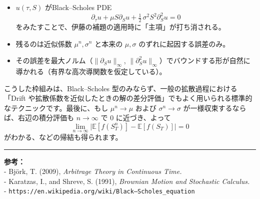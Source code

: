 \documentclass[a4paper]{jsarticle}
\begin{document}
\begin{itemize}  
\item $u(\tau,S)$ がBlack--Scholes PDE  
\[  
  \partial_\tau u + \mu S \partial_S u + \tfrac12\,\sigma^2 S^2 \partial_S^2 u = 0  
\]  
をみたすことで、伊藤の補題の適用時に「主項」が打ち消される。  
\item 残るのは近似係数 $\mu^n,\sigma^n$ と本来の $\mu,\sigma$ のずれに起因する誤差のみ。  
\item その誤差を最大ノルム（$\|\partial_S u\|_\infty$, $\|\partial_S^2 u\|_\infty$）でバウンドする形が自然に導かれる（有界な高次導関数を仮定している）。  
\end{itemize}  

こうした枠組みは、Black--Scholes 型のみならず、一般の拡散過程における「Drift や拡散係数を近似したときの解の差分評価」でもよく用いられる標準的なテクニックです。最後に、もし $\mu^n \to \mu$ および $\sigma^n \to \sigma$ が一様収束するならば、右辺の積分評価も $n\to\infty$ で 0 に近づき、よって  
\[  
  \lim_{n\to\infty}  
  \bigl|\mathbb{E}[f(S_T^n)] - \mathbb{E}[f(S_T)]\bigr|  
  =0  
\]  
がわかる、などの帰結も得られます。  

\bigskip  

\hrule  
\bigskip  

{\bf 参考：}\\
- Bj\"{o}rk, T. (2009), {\it Arbitrage Theory in Continuous Time.}\\
- Karatzas, I., and Shreve, S. (1991), {\it Brownian Motion and Stochastic Calculus.}\\
- \texttt{https://en.wikipedia.org/wiki/Black–Scholes\_equation}  
\end{document}
